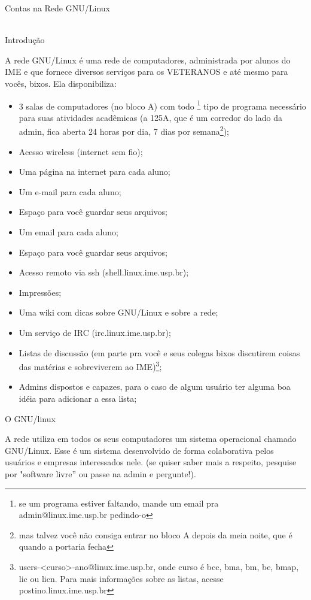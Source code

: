 \begin{secao}{Contas na Rede GNU/Linux}
\\
\\
\begin{subsecao}{Introdução}

A rede GNU/Linux é uma rede de computadores, administrada por alunos do IME e
que fornece diversos serviços para os VETERANOS e até mesmo para vocês, bixos.
Ela disponibiliza:

\begin{itemize}
\item 3 salas de computadores (no bloco A) com todo \footnote{se um programa
estiver faltando, mande um email pra admin@linux.ime.usp.br pedindo-o} tipo de
programa necessário para suas atividades acadêmicas (a 125A, que é um corredor
do lado da admin, fica aberta 24 horas por dia, 7 dias por semana\footnote{mas
talvez você não consiga entrar no bloco A depois da meia noite, que é quando a
portaria fecha});
\item Acesso wireless (internet sem fio);
\item Uma página na internet para cada aluno;
\item Um e-mail para cada aluno;
\item Espaço para você guardar seus arquivos;
\item Um email para cada aluno;
\item Espaço para você guardar seus arquivos;
\item Acesso remoto via ssh (shell.linux.ime.usp.br);
\item Impressões;
\item Uma wiki com dicas sobre GNU/Linux e sobre a rede;
\item Um serviço de IRC (irc.linux.ime.usp.br);
\item Listas de discussão (em parte pra você e seus colegas bixos discutirem
coisas das matérias e sobreviverem ao IME)\footnote{
users-<curso>-ano@linux.ime.usp.br, onde curso é bcc, bma, bm, be, bmap, lic ou
licn. Para mais informações sobre as listas, acesse postino.linux.ime.usp.br};
\item Admins dispostos e capazes, para o caso de algum usuário ter alguma boa
idéia para adicionar a essa lista;
\end{itemize}
\end{subsecao}

\begin{subsecao}{O GNU/linux }

A rede utiliza em todos os seus computadores um sistema operacional chamado
GNU/Linux. Esse é um sistema desenvolvido de forma colaborativa pelos usuários
e empresas interessados nele. (se quiser saber mais a respeito, pesquise
por "software livre” ou passe na admin e pergunte!).


\end{subsecao}
\end{secao}
